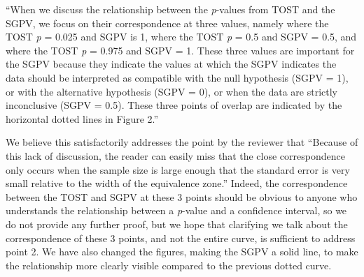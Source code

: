 \documentclass[man]{apa6}
\begin{document}
\enquote{When we discuss the relationship between the \emph{p}-values from TOST and the SGPV, we focus on their correspondence at three values, namely where the TOST \emph{p} = 0.025 and SGPV is 1, where the TOST \emph{p} = 0.5 and SGPV = 0.5, and where the TOST \emph{p} = 0.975 and SGPV = 1. These three values are important for the SGPV because they indicate the values at which the SGPV indicates the data should be interpreted as compatible with the null hypothesis (SGPV = 1), or with the alternative hypothesis (SGPV = 0), or when the data are strictly inconclusive (SGPV = 0.5). These three points of overlap are indicated by the horizontal dotted lines in Figure 2.}

We believe this satisfactorily addresses the point by the reviewer that \enquote{Because of this lack of discussion, the reader can easily miss that the close correspondence only occurs when the sample size is large enough that the standard error is very small relative to the width of the equivalence zone.} Indeed, the correspondence between the TOST and SGPV at these 3 points should be obvious to anyone who understands the relationship between a \emph{p}-value and a confidence interval, so we do not provide any further proof, but we hope that clarifying we talk about the correspondence of these 3 points, and not the entire curve, is sufficient to address point 2. We have also changed the figures, making the SGPV a solid line, to make the relationship more clearly visible compared to the previous dotted curve.
\end{document}
